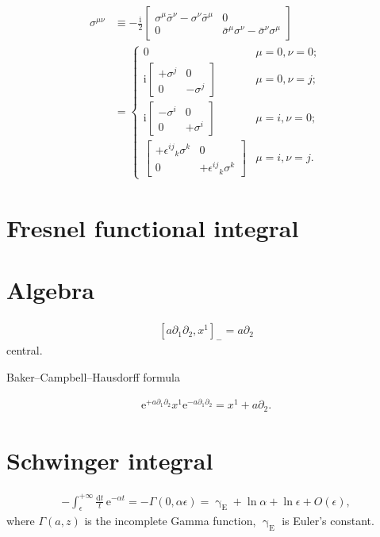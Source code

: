 \documentclass[12pt]{article}
\newcommand\mi{\mathrm{i}} %
\newcommand\me{\mathrm{e}} %
\newcommand\dif{\mathrm{d}}
\newcommand{\sbr}[1]{{\left[#1\right]}}
\newcommand{\rfun}[2]{{#1}\mathopen{}\left(#2\right)\mathclose{}}
\begin{document}
\begin{align}
\sigma^{\mu\nu} &\equiv -\frac{\mi}{2}
\begin{bmatrix}
\sigma^\mu\bar\sigma^\nu-\sigma^\nu\bar\sigma^\mu & 0 \\
0 & \bar\sigma^\mu\sigma^\nu-\bar\sigma^\nu\sigma^\mu
\end{bmatrix} \nonumber \\
&=
\begin{cases}
0 & \mu = 0, \nu = 0; \\
\mi \begin{bmatrix}+\sigma^j & 0 \\ 0 & -\sigma^j\end{bmatrix}
& \mu = 0, \nu = j; \\
\mi \begin{bmatrix}-\sigma^i & 0 \\ 0 & +\sigma^i\end{bmatrix}
& \mu = i, \nu = 0; \\
\begin{bmatrix}
+\epsilon^{ij}{}_k \sigma^k & 0
\\ 0 & +\epsilon^{ij}{}_k \sigma^k\end{bmatrix}
& \mu = i, \nu = j.
\end{cases}
\end{align}

\section{Fresnel functional integral}


\citep[ch.\ 10]{mosel2004}

\section{Algebra}
\begin{align}
\sbr{a\partial_1 \partial_2, x^1}_- = a\partial_2
\end{align}
central.

Baker--Campbell--Hausdorff formula

\begin{align}
\me^{+a\partial_1\partial_2} x^1 \me^{-a\partial_1\partial_2}
= x^1 + a \partial_2.
\end{align}

\section{Schwinger integral}


\begin{align}
-\int_{\epsilon}^{+\infty} \frac{\dif t}{t}\,\me^{-\alpha t} =
-\rfun{\Gamma}{0, \alpha \epsilon} = \upgamma_\text{E} + \ln\alpha + 
\ln\epsilon + \rfun{O}{\epsilon},
\end{align}
where $\rfun{\Gamma}{a,z}$ is the incomplete Gamma function, 
$\upgamma_\text{E}$ is Euler's constant.




\end{document}
